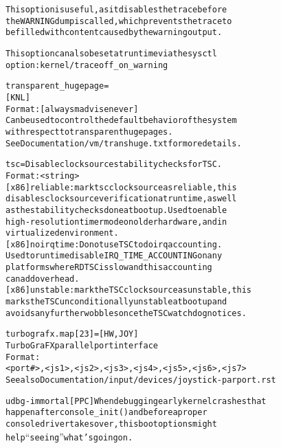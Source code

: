 \documentclass[a4paper,8pt,english]{sphinxmanual}
\begin{document}
\begin{alltt}
                        This option is useful, as it disables the trace before
                        the WARNING dump is called, which prevents the trace to
                        be filled with content caused by the warning output.

                        This option can also be set at run time via the sysctl
                        option:  kernel/traceoff\_on\_warning

        transparent\_hugepage=
                        {[}KNL{]}
                        Format: {[}always\textbar{}madvise\textbar{}never{]}
                        Can be used to control the default behavior of the system
                        with respect to transparent hugepages.
                        See Documentation/vm/transhuge.txt for more details.

        tsc=            Disable clocksource stability checks for TSC.
                        Format: \textless{}string\textgreater{}
                        {[}x86{]} reliable: mark tsc clocksource as reliable, this
                        disables clocksource verification at runtime, as well
                        as the stability checks done at bootup. Used to enable
                        high-resolution timer mode on older hardware, and in
                        virtualized environment.
                        {[}x86{]} noirqtime: Do not use TSC to do irq accounting.
                        Used to run time disable IRQ\_TIME\_ACCOUNTING on any
                        platforms where RDTSC is slow and this accounting
                        can add overhead.
                        {[}x86{]} unstable: mark the TSC clocksource as unstable, this
                        marks the TSC unconditionally unstable at bootup and
                        avoids any further wobbles once the TSC watchdog notices.

        turbografx.map{[}2\textbar{}3{]}=    {[}HW,JOY{]}
                        TurboGraFX parallel port interface
                        Format:
                        \textless{}port\#\textgreater{},\textless{}js1\textgreater{},\textless{}js2\textgreater{},\textless{}js3\textgreater{},\textless{}js4\textgreater{},\textless{}js5\textgreater{},\textless{}js6\textgreater{},\textless{}js7\textgreater{}
                        See also Documentation/input/devices/joystick-parport.rst

        udbg-immortal   {[}PPC{]} When debugging early kernel crashes that
                        happen after console\_init() and before a proper
                        console driver takes over, this boot options might
                        help ``seeing'' what's going on.


\end{alltt}
\end{document}
